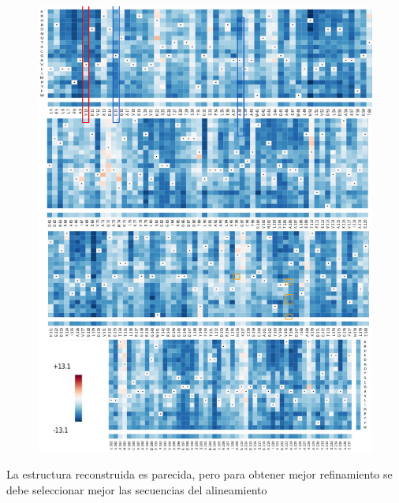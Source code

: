 \documentclass[12pt,twoside]{reedthesis}
\begin{document}
  \begin{figure}[h!tbp]
  \centering
  \includegraphics[angle = 0,scale = .8]{chapter4/Couplings/PriAMutations.pdf}
  \caption[Tendencia de mutaciones observada en secuencias de PriA]{\footnotesize{}}
  \label{fig:CouplingsMutationsPriA}
  \end{figure}
  
  La estructura reconstruida es parecida, pero para obtener mejor
  refinamiento se debe seleccionar mejor las secuencias del alineamiento
  
\end{document}
